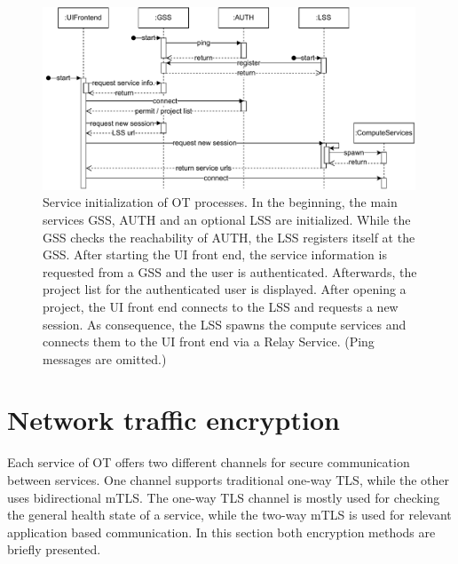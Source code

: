 \begin{figure}[ht]
	\centering
	\includegraphics[width=0.99\textwidth]{Figures/opentwin-network-communication-sequence.pdf}
	\caption{Service initialization of \ac{OT} processes. In the beginning, the main services \ac{GSS}, \ac{AUTH} and an optional \ac{LSS} are initialized. While the \ac{GSS} checks the reachability of \ac{AUTH}, the \ac{LSS} registers itself at the \ac{GSS}. After starting the \ac{UI} front end, the service information is requested from a \ac{GSS} and the user is authenticated. Afterwards, the project list for the authenticated user is displayed. After opening a project, the \ac{UI} front end connects to the \ac{LSS} and requests a new session. As consequence, the \ac{LSS} spawns the compute services and connects them to the \ac{UI} front end via a Relay Service. (Ping messages are omitted.)}
	\label{fig:ot-network-communication-sequence}
\end{figure}



\section{Network traffic encryption}

Each service of \ac{OT} offers two different channels for secure communication between services. One channel supports traditional one-way \ac{TLS}, while the other uses bidirectional \ac{mTLS}. The one-way \ac{TLS} channel is mostly used for checking the general health state of a service, while the two-way \ac{mTLS} is used for relevant application based communication.
In this section both encryption methods are briefly presented.

